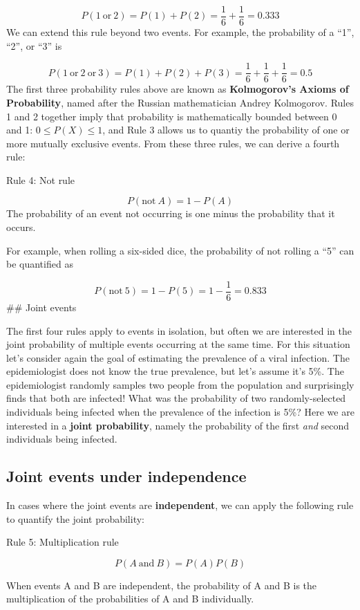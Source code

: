 \documentclass[
]{book}
\begin{document}
\[
P(1\ \text{or}\ 2) = P(1) + P(2) = \frac{1}{6}+\frac{1}{6}=0.333
\]
We can extend this rule beyond two events. For example, the probability of a ``1'', ``2'', or ``3'' is

\[
P(1\ \text{or}\ 2\ \text{or}\ 3) = P(1) + P(2) +P(3) = \frac{1}{6}+\frac{1}{6}+\frac{1}{6}=0.5
\]
The first three probability rules above are known as \textbf{Kolmogorov's Axioms of Probability}, named after the Russian mathematician Andrey Kolmogorov. Rules 1 and 2 together imply that probability is mathematically bounded between 0 and 1: \(0 \leq P(X) \leq 1\), and Rule 3 allows us to quantiy the probability of one or more mutually exclusive events. From these three rules, we can derive a fourth rule:

Rule 4: Not rule

\[
P(\text{not}\ A) = 1 - P(A)
\]
The probability of an event not occurring is one minus the probability that it occurs.

For example, when rolling a six-sided dice, the probability of not rolling a ``5'' can be quantified as

\[
P(\text{not}\ 5) = 1 - P(5) =1-\frac{1}{6}=0.833
\]
\#\# Joint events

The first four rules apply to events in isolation, but often we are interested in the joint probability of multiple events occurring at the same time. For this situation let's consider again the goal of estimating the prevalence of a viral infection. The epidemiologist does not know the true prevalence, but let's assume it's 5\%. The epidemiologist randomly samples two people from the population and surprisingly finds that both are infected! What was the probability of two randomly-selected individuals being infected when the prevalence of the infection is 5\%? Here we are interested in a \textbf{joint probability}, namely the probability of the first \emph{and} second individuals being infected.

\subsection{Joint events under independence}\label{joint-events-under-independence}

In cases where the joint events are \textbf{independent}, we can apply the following rule to quantify the joint probability:

Rule 5: Multiplication rule

\[
P(A\ \text{and}\ B) = P(A)P(B)
\]

When events A and B are independent, the probability of A and B is the multiplication of the probabilities of A and B individually.
\end{document}
